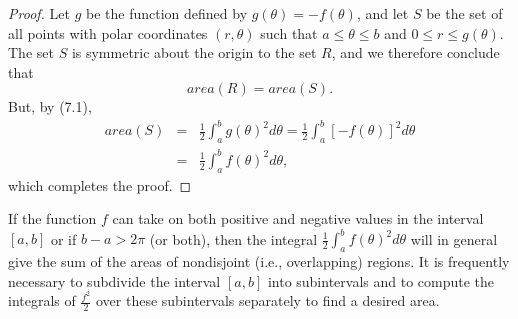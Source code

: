 
\begin{proof}
Let $g$ be the function defined by $g(\theta) = -f(\theta)$, and let $S$ be the set of all points with polar coordinates $(r, \theta)$ such that $a \leq \theta \leq b$ and $0 \leq r \leq g(\theta)$. The set $S$ is symmetric about the origin to the set $R$, and we therefore conclude that 
$$
area(R) = area(S).
$$
But, by (7.1), 
\begin{eqnarray*}
area(S) 
&=& \frac{1}{2} \int_a^b  g(\theta)^2 d\theta = \frac{1}{2} \int_a^b  [-f(\theta)]^2 d\theta \\
&=& \frac{1}{2} \int_a^b f(\theta)^2 d\theta,
\end{eqnarray*}
which completes the proof.
\end{proof}

If the function $f$ can take on both positive and negative values in the interval $[a, b]$ or if $b - a >2\pi$ (or both), then the integral $\frac{1}{2} \int_a^b f(\theta)^2 d\theta$ will in general give the sum of the areas of nondisjoint (i.e., overlapping) regions. It is frequently necessary to subdivide the interval $[a, b]$ into subintervals and to compute the integrals of $\frac{f^2}{2}$ over these subintervals separately to find a desired area.  



